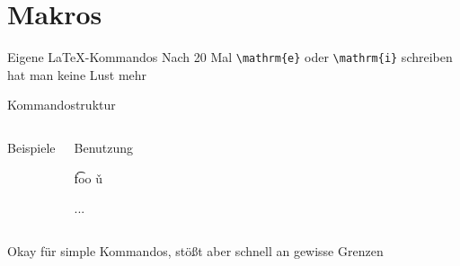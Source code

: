\section{Makros}

\begin{frame}[fragile]{Eigene \LaTeX-Kommandos}
  Nach 20 Mal \verb+\mathrm{e}+ oder \verb+\mathrm{i}+ schreiben hat man keine Lust mehr
  \begin{block}{Kommandostruktur}
    \begin{lstverbatim}
    \newcommand\Kommandoname[#Argumente]{Code mit #1, #2, ...} 
    \newenvironment{Umgebungsname}[#Argumente]{\begin-Code}{\end-Code}
    \end{lstverbatim}
  \end{block}
  \begin{columns}[T]
    \begin{block}{Beispiele}
      \begin{lstverbatim}
      \newcommand\I{\mathrm{i}} 
      \newcommand\t[1]{\text{#1}}
      \newcommand\dd[2]{\frac{\mathrm{d}#1}{\mathrm{d}#2}}
      \renewcommand\v[1]{\vec{#1}} %
      \newenvironment{eqn}{\begin{equation}}{\end{equation}}
      \end{lstverbatim}
    \end{block}
    \begin{block}{Benutzung}
      \begin{lstverbatim}
      \I
      \t{foo}
      \v{u}
      \begin{eqn} 
        ...
      \end{eqn}
      \end{lstverbatim}
    \end{block}
  \end{columns}
  \vspace{0.5cm}
  \mbox{\rightarrow} Okay für simple Kommandos, stößt aber schnell an gewisse Grenzen
\end{frame}

